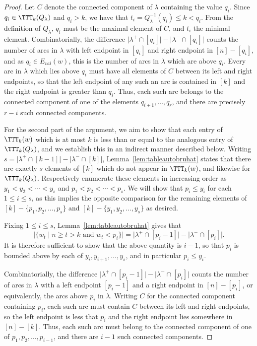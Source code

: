 \documentclass[12pt]{amsart}
\theoremstyle{definition}
\theoremstyle{remark}
\numberwithin{equation}{section}
\renewcommand{\setminus}{-}
\newcommand{\EV}{E_{val}}
\begin{document}
\begin{proof}
Let $C$ denote the connected component of $\lambda$ containing the value $q_{i}$.  Since $q_i\in \TTT_{k}(Q_{\lambda})$ and $q_i>k$, we have that $t_i=Q_{\lambda}^{-1}(q_{i})\le k <q_i$.
From the definition of $Q_{\lambda}$, $q_{i}$ must be the maximal element of $C$,  and $t_i$ the minimal element.  
Combinatorially, the difference $\big|\lambda^{+} \cap [q_{i}]\big| - \big|\lambda^{-} \cap [q_{i}]\big|$ counts the number of arcs in $\lambda$ with left endpoint in $[q_{i}]$ and right endpoint in $[n] \setminus [q_{i}]$, and as $q_{i} \in \EV(w)$, this is the number of arcs in $\lambda$ which are above $q_{i}$.  
Every arc in $\lambda$ which lies above $q_{i}$ must have all elements of $C$ between its left and right endpoints, so that the left endpoint of any such an arc is contained in $[k]$ and the right endpoint is greater than $q_{i}$.  
Thus, each such arc belongs to the connected component of one of the elements $q_{i+1}, \ldots, q_{r}$, and there are precisely $r - i$ such connected components.

For the second part of the argument, we aim to show that each entry of $\TTT_{k}(w)$ which is at most $k$ is less than or equal to the analogous entry of $\TTT_{k}(Q_{\lambda})$, and we establish this in an indirect manner described below.  
Writing $s = \big|\lambda^{+} \cap [k-1]\big| - \big|\lambda^{-} \cap [k]\big|$, Lemma~\ref{lem:tableautobruhat} states that there are exactly $s$ elements of $[k]$ which do not appear in $\TTT_{k}(w)$, and likewise for $\TTT_{k}(Q_{\lambda})$.  
Respectively enumerate these elements in increasing order as $y_{1} < y_{2} < \cdots < y_{s}$ and $p_{1} < p_{2} < \cdots < p_{s}$.  
We will show that $p_{i} \le y_{i}$ for each $1 \le i \le s$, as this implies the opposite comparison for the remaining elements of $[k] \setminus \{p_{1}, p_{2}, \ldots, p_{s}\}$ and $[k] \setminus \{y_{1}, y_{2}, \ldots, y_{s}\}$ as desired.  

Fixing $1 \le i \le s$, Lemma~\ref{lem:tableautobruhat} gives that
\[
\big|\{ w_{t} \;|\; \text{$n \ge t > k$ and $w_{t} < p_{i}$} \}\big| = \big|\lambda^{+} \cap [p_{i} - 1]\big| - \big|\lambda^{-} \cap [p_{i}]\big|.
\]
It is therefore sufficient to show that the above quantity is $i-1$, so that $p_{i}$ is bounded above by each of $y_{i}, y_{i+1}, \ldots, y_{s}$, and in particular $p_{i} \le y_{i}$.

Combinatorially, the difference $\big|\lambda^{+} \cap [p_{i} - 1]\big| - \big|\lambda^{-} \cap [p_{i}]\big|$ counts the number of arcs in $\lambda$ with a left endpoint $[p_{i} -1]$ and a right endpoint in $[n] \setminus [p_{i}]$, or equivalently, the arcs above $p_{i}$ in $\lambda$.  
Writing $C$ for the connected component containing $p_{i}$, each such arc must contain $C$ between its left and right endpoints, so the left endpoint is less that $p_{i}$ and the right endpoint lies somewhere in $[n] \setminus [k]$.  
Thus, each such arc must belong to the connected component of one of $p_{1}, p_{2}, \ldots, p_{i-1}$, and there are $i-1$ such connected components.
\end{proof}
\end{document}
